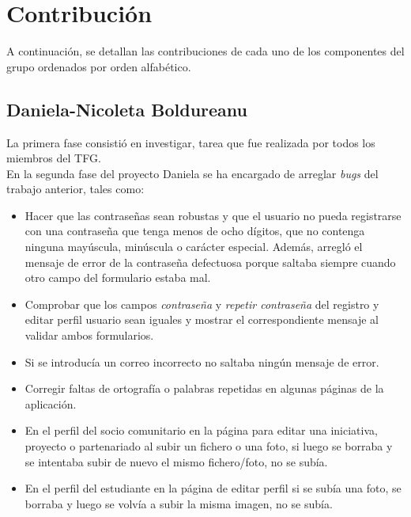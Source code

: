 \documentclass[11pt]{book}
\begin{document}
	\chapter{Contribución}
	A continuación, se detallan las contribuciones de cada uno de los componentes del grupo ordenados por orden alfabético.
	\section{Daniela-Nicoleta Boldureanu}
	La primera fase consistió en investigar, tarea que fue realizada por todos los miembros del TFG.\\
	En la segunda fase del proyecto Daniela se ha encargado de arreglar \textit{bugs} del trabajo anterior, tales como:
	\begin{itemize} 
		\item Hacer que las contraseñas sean robustas y que el usuario no pueda registrarse con una contraseña que tenga menos de ocho dígitos, que no contenga ninguna mayúscula, minúscula o carácter especial. Además, arregló el mensaje de error de la contraseña defectuosa porque saltaba siempre cuando otro campo del formulario estaba mal.
		\item Comprobar que los campos \emph{contraseña} y \emph{repetir contraseña} del registro y editar perfil usuario sean iguales y mostrar el correspondiente mensaje al validar ambos formularios.
		\item Si se introducía un correo incorrecto no saltaba ningún mensaje de error.
		\item Corregir faltas de ortografía o palabras repetidas en algunas páginas de la aplicación.
		\item En el perfil del socio comunitario en la página para editar una iniciativa, proyecto o partenariado al subir un fichero o una foto, si luego se borraba y se intentaba subir de nuevo el mismo fichero/foto, no se subía.
		\item En el perfil del estudiante en la página de editar perfil si se subía una foto, se borraba y luego se volvía a subir la misma imagen, no se subía.
	\end{itemize}
	
\end{document}
